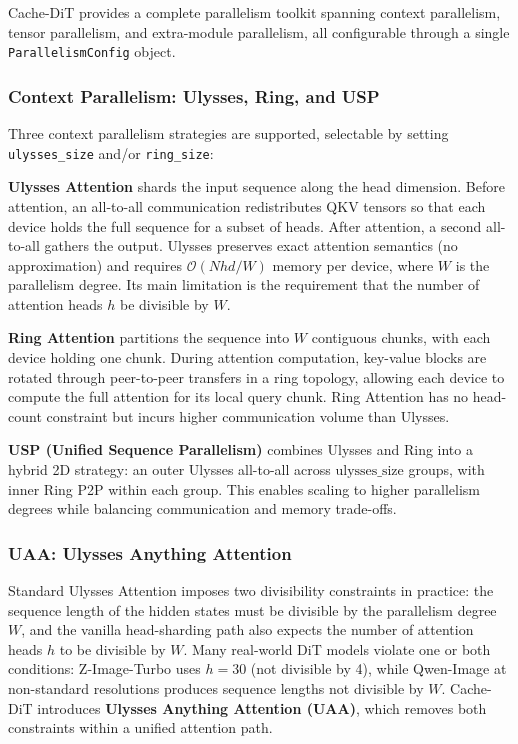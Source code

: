 \documentclass[10pt]{article}
\begin{document}
Cache-DiT provides a complete parallelism toolkit spanning context parallelism, tensor parallelism, and extra-module parallelism, all configurable through a single \texttt{ParallelismConfig} object.

\subsubsection{Context Parallelism: Ulysses, Ring, and USP}

Three context parallelism strategies are supported, selectable by setting \texttt{ulysses\_size} and/or \texttt{ring\_size}:

\textbf{Ulysses Attention} shards the input sequence along the head dimension. Before attention, an all-to-all communication redistributes QKV tensors so that each device holds the full sequence for a subset of heads. After attention, a second all-to-all gathers the output. Ulysses preserves exact attention semantics (no approximation) and requires $\mathcal{O}(Nhd/W)$ memory per device, where $W$ is the parallelism degree. Its main limitation is the requirement that the number of attention heads $h$ be divisible by $W$.

\textbf{Ring Attention} partitions the sequence into $W$ contiguous chunks, with each device holding one chunk. During attention computation, key-value blocks are rotated through peer-to-peer transfers in a ring topology, allowing each device to compute the full attention for its local query chunk. Ring Attention has no head-count constraint but incurs higher communication volume than Ulysses.

\textbf{USP (Unified Sequence Parallelism)} combines Ulysses and Ring into a hybrid 2D strategy: an outer Ulysses all-to-all across $\text{ulysses\_size}$ groups, with inner Ring P2P within each group. This enables scaling to higher parallelism degrees while balancing communication and memory trade-offs.

\subsubsection{UAA: Ulysses Anything Attention}

Standard Ulysses Attention imposes two divisibility constraints in practice: the sequence length of the hidden states must be divisible by the parallelism degree $W$, and the vanilla head-sharding path also expects the number of attention heads $h$ to be divisible by $W$. Many real-world DiT models violate one or both conditions: Z-Image-Turbo uses $h=30$ (not divisible by 4), while Qwen-Image at non-standard resolutions produces sequence lengths not divisible by $W$. Cache-DiT introduces \textbf{Ulysses Anything Attention (UAA)}, which removes both constraints within a unified attention path.
\end{document}
